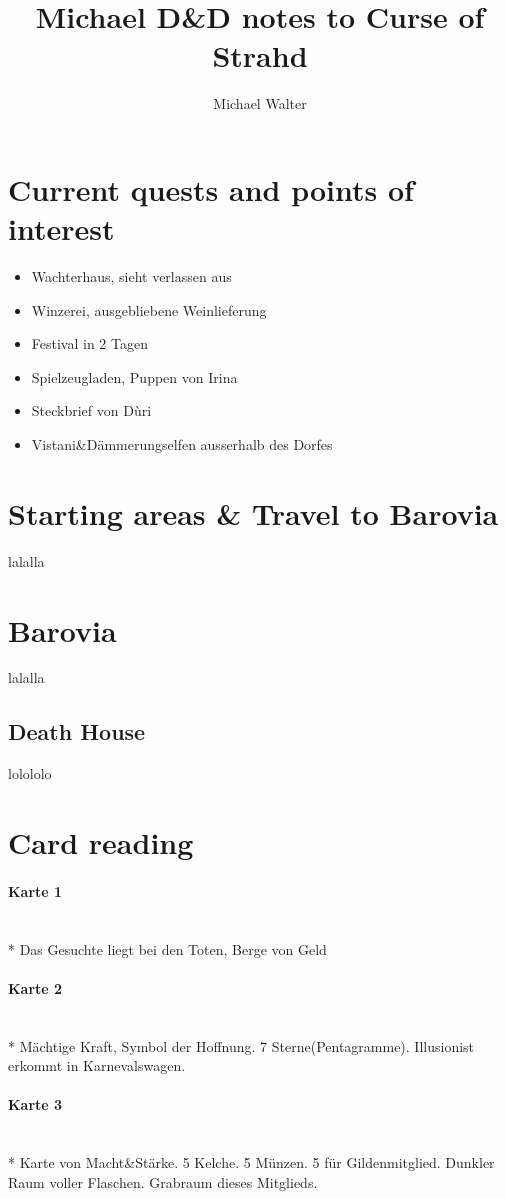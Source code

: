 \documentclass{article}
\begin{document}
\title{Michael D\&D notes to Curse of Strahd}
\author{Michael Walter}
\maketitle
\section{Current quests and points of interest}
\begin{itemize}
	\item Wachterhaus, sieht verlassen aus
	\item Winzerei, ausgebliebene Weinlieferung
	\item Festival in 2 Tagen
	\item Spielzeugladen, Puppen von Irina
	\item Steckbrief von Dùri
	\item Vistani\&Dämmerungselfen ausserhalb des Dorfes
\end{itemize}
\section{Starting areas \& Travel to Barovia}
lalalla
\section{Barovia}
lalalla
\subsection{Death House}
lolololo
\section{Card reading}
\paragraph{Karte 1} ~\\*
Das Gesuchte liegt bei den Toten, Berge von Geld
\paragraph{Karte 2} ~\\*
Mächtige Kraft, Symbol der Hoffnung. 7 Sterne(Pentagramme). Illusionist erkommt in Karnevalswagen.
\paragraph{Karte 3} ~\\*
Karte von Macht\&Stärke. 5 Kelche. 5 Münzen. 5 für Gildenmitglied. Dunkler Raum voller Flaschen. Grabraum dieses Mitglieds.
\end{document}
